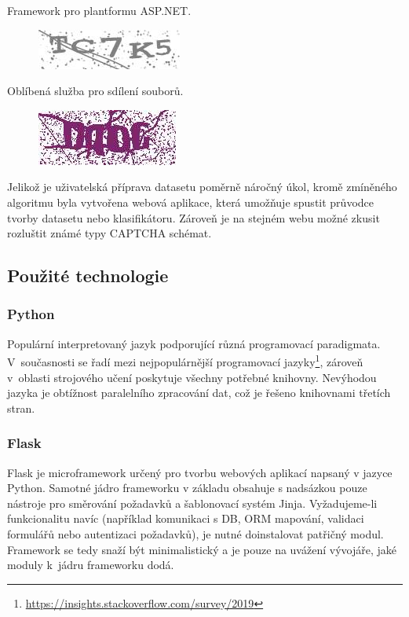 \documentclass[
  field=ainfp,
  master=true,
  biblatex,
  sourcecodes=false,
  theorems=false,
  glossaries,
  index
]{kidiplom}
\begin{document}
\begin{description}[align=left]
\item [\href{https://telerik.com}{telerik.com}] Framework pro plantformu ASP.NET.
\begin{figure}[H]
  \centering
  \includegraphics{images/telerik.jpg}
\end{figure}

\item  [\href{https://ulozto.cz}{ulozto.cz}] Oblíbená služba pro sdílení souborů.
\begin{figure}[H]
  \centering
  \includegraphics{images/ulozto.jpg}
\end{figure}
\end{description}


Jelikož je uživatelská příprava datasetu poměrně náročný úkol, kromě zmíně\-ného algoritmu byla vytvořena webová aplikace, která umožňuje spustit průvodce tvorby datasetu nebo klasifikátoru. Zároveň je na stejném webu možné zkusit rozluštit známé typy CAPTCHA schémat. 

\subsection{Použité technologie}
\subsubsection*{Python}
Populární interpretovaný jazyk podporující různá programovací paradigmata. V~současnosti se řadí mezi 
nejpopulárnější programovací jazyky\footnote{\url{https://insights.stackoverflow.com/survey/2019}}, zároveň v~ob\-lasti strojového učení poskytuje všechny potřebné knihovny. Nevýhodou jazyka je obtížnost paralelního zpracování dat, což je řešeno knihovnami třetích stran.

\subsubsection*{Flask}
Flask je microframework určený pro tvorbu webových aplikací napsaný v jazy\-ce Python. Samotné jádro frameworku v základu obsahuje s nadsázkou pouze ná\-stroje pro směrování požadavků a šablonovací systém Jinja. Vyžadujeme-li funk\-cio\-nalitu navíc (například komunikaci s DB, ORM mapování, validaci formulářů nebo autentizaci požadavků), je nutné doinstalovat patřičný modul. Framework se tedy snaží být minimalistický a je pouze na uvážení vývojáře, jaké moduly k~jádru frameworku dodá. 
\end{document}
